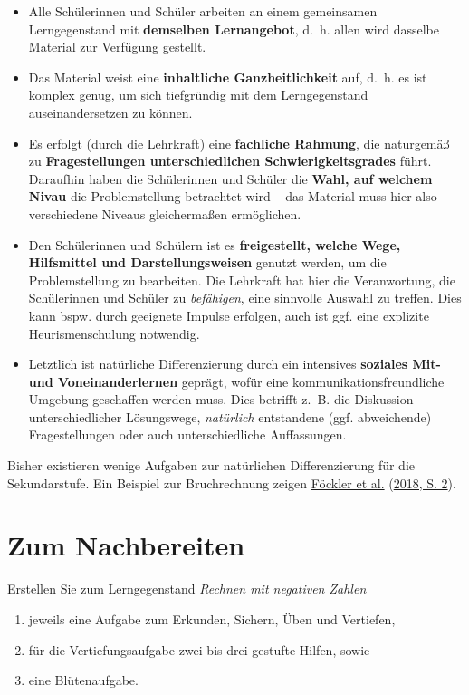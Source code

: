 \documentclass[
  ngerman,
]{scrbook}
\theoremstyle{definition}
\theoremstyle{definition}
\theoremstyle{definition}
\theoremstyle{definition}
\theoremstyle{remark}
\begin{document}
\begin{itemize}
\item
  Alle Schülerinnen und Schüler arbeiten an einem gemeinsamen Lerngegenstand mit \textbf{demselben Lernangebot}, d.~h. allen wird dasselbe Material zur Verfügung gestellt.
\item
  Das Material weist eine \textbf{inhaltliche Ganzheitlichkeit} auf, d.~h. es ist komplex genug, um sich tiefgründig mit dem Lerngegenstand auseinandersetzen zu können.
\item
  Es erfolgt (durch die Lehrkraft) eine \textbf{fachliche Rahmung}, die naturgemäß zu \textbf{Fragestellungen unterschiedlichen Schwierigkeitsgrades} führt. Daraufhin haben die Schülerinnen und Schüler die \textbf{Wahl, auf welchem Nivau} die Problemstellung betrachtet wird -- das Material muss hier also verschiedene Niveaus gleichermaßen ermöglichen.
\item
  Den Schülerinnen und Schülern ist es \textbf{freigestellt, welche Wege, Hilfsmittel und Darstellungsweisen} genutzt werden, um die Problemstellung zu bearbeiten. Die Lehrkraft hat hier die Veranwortung, die Schülerinnen und Schüler zu \emph{befähigen}, eine sinnvolle Auswahl zu treffen. Dies kann bspw. durch geeignete Impulse erfolgen, auch ist ggf. eine explizite Heurismenschulung notwendig.
\item
  Letztlich ist natürliche Differenzierung durch ein intensives \textbf{soziales Mit- und Voneinanderlernen} geprägt, wofür eine kommunikationsfreundliche Umgebung geschaffen werden muss. Dies betrifft z.~B. die Diskussion unterschiedlicher Lösungswege, \emph{natürlich} entstandene (ggf. abweichende) Fragestellungen oder auch unterschiedliche Auffassungen.
\end{itemize}

Bisher existieren wenige Aufgaben zur natürlichen Differenzierung für die Sekundarstufe. Ein Beispiel zur Bruchrechnung zeigen \protect\hyperlink{ref-Fockler2018}{Föckler et al.} (\protect\hyperlink{ref-Fockler2018}{2018, S. 2}).

\hypertarget{aufgaben-gestalten-nachbereitung}{%
\section{Zum Nachbereiten}\label{aufgaben-gestalten-nachbereitung}}

Erstellen Sie zum Lerngegenstand \emph{Rechnen mit negativen Zahlen}

\begin{enumerate}
\def\labelenumi{\alph{enumi})}
\item
  jeweils eine Aufgabe zum Erkunden, Sichern, Üben und Vertiefen,
\item
  für die Vertiefungsaufgabe zwei bis drei gestufte Hilfen, sowie
\item
  eine Blütenaufgabe.
\end{enumerate}
\end{document}
